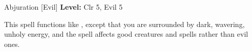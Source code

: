 {Abjuration [Evil]}
{
	\textbf{Level:}
	Clr 5, Evil 5\\
}
{
	This spell functions like , except that you are surrounded by dark, wavering, unholy energy, and the spell affects good creatures and spells rather than evil ones.

}
